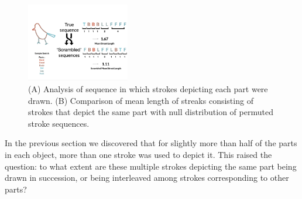 \documentclass[10pt,letterpaper]{article}
\begin{document}
\begin{figure}[ht]
\centering
\includegraphics[width=0.4\textwidth]{figures/part_sequence.pdf}
\caption{(A) Analysis of sequence in which strokes depicting each part were drawn. (B) Comparison of mean length of streaks consisting of strokes that depict the same part with null distribution of permuted stroke sequences.}
\label{stroke_sequence_fig}
\end{figure}


In the previous section we discovered that for slightly more than half of the parts in each object, more than one stroke was used to depict it. 
This raised the question: to what extent are these multiple strokes depicting the same part being drawn in succession, or being interleaved among strokes corresponding to other parts?
\end{document}
